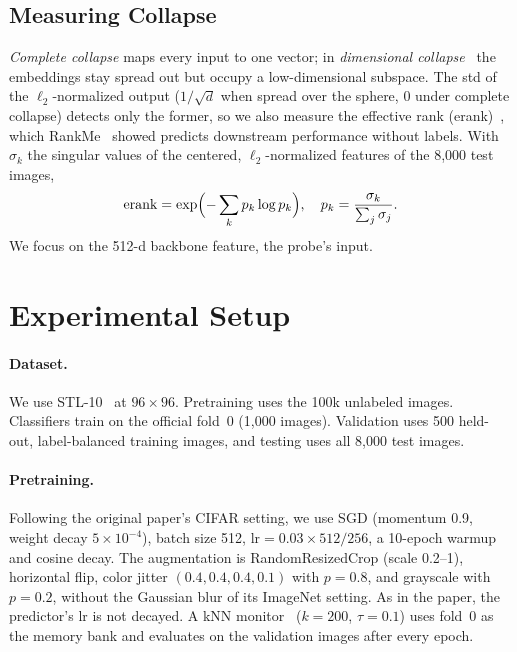 \documentclass[10pt,twocolumn,letterpaper]{article}
\begin{document}

\subsection{Measuring Collapse}
\emph{Complete collapse} maps every input to one vector; in \emph{dimensional collapse}~\cite{hua2021feature,jing2022dimensional} the embeddings stay spread out but occupy a low-dimensional subspace.
The std of the $\ell_2$-normalized output ($1/\sqrt{d}$ when spread over the sphere, $0$ under complete collapse) detects only the former, so we also measure the effective rank (erank)~\cite{roy2007erank}, which RankMe~\cite{garrido2023rankme} showed predicts downstream performance without labels.
With $\sigma_k$ the singular values of the centered, $\ell_2$-normalized features of the 8,000 test images,
\begin{equation}
\text{erank}=\exp\Bigl(-\sum_k p_k\log p_k\Bigr),\quad p_k=\frac{\sigma_k}{\sum_j\sigma_j}.
\end{equation}
We focus on the 512-d backbone feature, the probe's input.

\section{Experimental Setup}
\label{sec:setup}

\paragraph{Dataset.}
We use STL-10~\cite{coates2011stl10} at $96\times96$. Pretraining uses the 100k unlabeled images.
Classifiers train on the official fold~0 (1,000 images). Validation uses 500 held-out, label-balanced training images, and testing uses all 8,000 test images.

\paragraph{Pretraining.}
Following the original paper's CIFAR setting, we use SGD (momentum 0.9, weight decay $5\!\times\!10^{-4}$), batch size 512, $\text{lr}=0.03\times512/256$, a 10-epoch warmup and cosine decay. The augmentation is RandomResizedCrop (scale 0.2--1), horizontal flip, color jitter $(0.4,0.4,0.4,0.1)$ with $p{=}0.8$, and grayscale with $p{=}0.2$, without the Gaussian blur of its ImageNet setting. As in the paper, the predictor's lr is not decayed.
A kNN monitor~\cite{wu2018instance} ($k{=}200$, $\tau{=}0.1$) uses fold~0 as the memory bank and evaluates on the validation images after every epoch.
\end{document}
